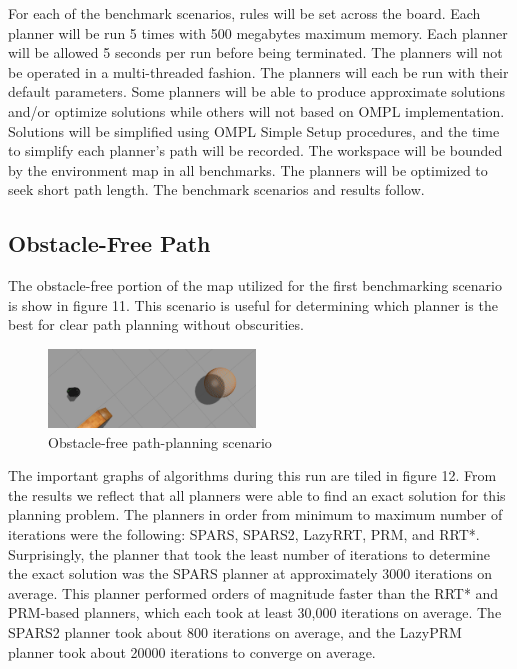 \documentclass[conference]{IEEEtran} \usepackage[T1]{fontenc} \usepackage[backend=biber, style=ieee]{biblatex}
\begin{document}
For each of the benchmark scenarios, rules will be set across the board. Each planner will be run 5 times with 500 megabytes maximum memory. Each planner will be allowed 5 
seconds per run before being terminated. The planners will not be operated in a multi-threaded fashion. The planners will each be run with their default parameters. Some 
planners will be able to produce approximate solutions and/or optimize solutions while others will not based on OMPL implementation. Solutions will be simplified using OMPL 
Simple Setup procedures, and the time to simplify each planner's path will be recorded. The workspace will be bounded by the environment map in all benchmarks. The planners 
will be optimized to seek short path length. The benchmark scenarios and results follow.

\subsection{Obstacle-Free Path} \label{Obstacle-free Path}

The obstacle-free portion of the map utilized for the first benchmarking scenario is show in figure 11. This scenario is useful for determining which planner is the
best for clear path planning without obscurities.

\begin{figure}
\label{figure11} 
\centering 
\includegraphics[width=0.49\textwidth]{scenario_1}
\caption{Obstacle-free path-planning scenario}
\end{figure}

The important graphs of algorithms during this run are tiled in figure 12. From the results we reflect that all planners were able to find an exact solution
for this planning problem. The planners in order from minimum to maximum number of iterations were the following: SPARS, SPARS2, LazyRRT, PRM, and RRT*. Surprisingly, the 
planner that took the least number of iterations to determine the exact solution was the SPARS planner at approximately 3000 iterations on average. This planner 
performed orders of magnitude faster than the RRT* and PRM-based planners, which each took at least 30,000 iterations on average. The SPARS2 planner took about 800
iterations on average, and the LazyPRM planner took about 20000 iterations to converge on average.
\end{document}
